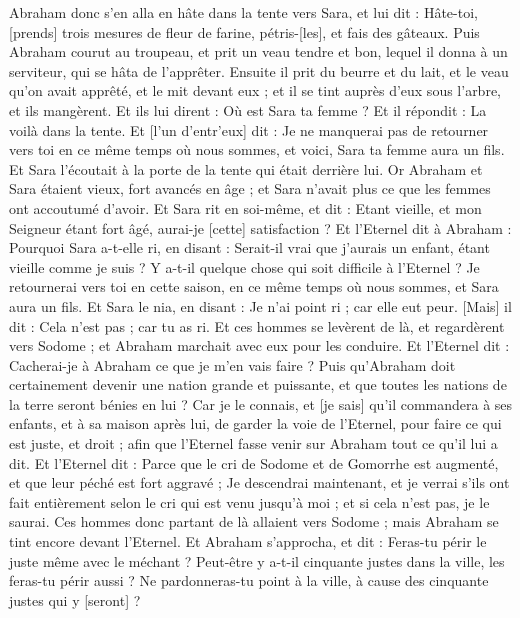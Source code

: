 \begin{multicols}{2}
Abraham donc s'en alla en hâte dans la tente vers Sara, et lui dit : Hâte-toi, [prends] trois mesures de fleur de farine, pétris-[les], et fais des gâteaux.
Puis Abraham courut au troupeau, et prit un veau tendre et bon, lequel il donna à un serviteur, qui se hâta de l'apprêter.
Ensuite il prit du beurre et du lait, et le veau qu'on avait apprêté, et le mit devant eux ; et il se tint auprès d'eux sous l'arbre, et ils mangèrent.
Et ils lui dirent : Où est Sara ta femme ? Et il répondit : La voilà dans la tente.
Et [l'un d'entr'eux] dit : Je ne manquerai pas de retourner vers toi en ce même temps où nous sommes, et voici, Sara ta femme aura un fils. Et Sara l'écoutait à la porte de la tente qui était derrière lui.
Or Abraham et Sara étaient vieux, fort avancés en âge ; et Sara n'avait plus ce que les femmes ont accoutumé d'avoir.
Et Sara rit en soi-même, et dit : Etant vieille, et mon Seigneur étant fort âgé, aurai-je [cette] satisfaction ?
Et l'Eternel dit à Abraham : Pourquoi Sara a-t-elle ri, en disant : Serait-il vrai que j'aurais un enfant, étant vieille comme je suis ?
Y a-t-il quelque chose qui soit difficile à l'Eternel ? Je retournerai vers toi en cette saison, en ce même temps où nous sommes, et Sara aura un fils.
Et Sara le nia, en disant : Je n'ai point ri ; car elle eut peur. [Mais] il dit : Cela n'est pas ; car tu as ri.
Et ces hommes se levèrent de là, et regardèrent vers Sodome ; et Abraham marchait avec eux pour les conduire.
Et l'Eternel dit : Cacherai-je à Abraham ce que je m'en vais faire ?
Puis qu'Abraham doit certainement devenir une nation grande et puissante, et que toutes les nations de la terre seront bénies en lui ?
Car je le connais, et [je sais] qu'il commandera à ses enfants, et à sa maison après lui, de garder la voie de l'Eternel, pour faire ce qui est juste, et droit ; afin que l'Eternel fasse venir sur Abraham tout ce qu'il lui a dit.
Et l'Eternel dit : Parce que le cri de Sodome et de Gomorrhe est augmenté, et que leur péché est fort aggravé ;
Je descendrai maintenant, et je verrai s'ils ont fait entièrement selon le cri qui est venu jusqu'à moi ; et si cela n'est pas, je le saurai.
Ces hommes donc partant de là allaient vers Sodome ; mais Abraham se tint encore devant l'Eternel.
Et Abraham s'approcha, et dit : Feras-tu périr le juste même avec le méchant ?
Peut-être y a-t-il cinquante justes dans la ville, les feras-tu périr aussi ? Ne pardonneras-tu point à la ville, à cause des cinquante justes qui y [seront] ?

\end{multicols}

